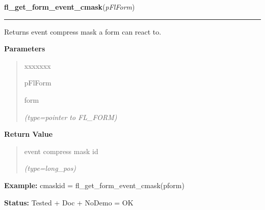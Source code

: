     \label{xformslib:flbasic:fl_get_form_event_cmask}

    \vspace{0.5ex}

\hspace{.8\funcindent}\begin{boxedminipage}{\funcwidth}

    \raggedright \textbf{fl\_get\_form\_event\_cmask}(\textit{pFlForm})

    \vspace{-1.5ex}

    \rule{\textwidth}{0.5\fboxrule}
\setlength{\parskip}{2ex}
    Returns event compress mask a form can react to.

\setlength{\parskip}{1ex}
      \textbf{Parameters}
      \vspace{-1ex}

      \begin{quote}
        \begin{Ventry}{xxxxxxx}

          \item[pFlForm]

          form

            {\it (type=pointer to FL\_FORM)}

        \end{Ventry}

      \end{quote}

      \textbf{Return Value}
    \vspace{-1ex}

      \begin{quote}
      event compress mask id

      {\it (type=long\_pos)}

      \end{quote}

\textbf{Example:} cmaskid = fl\_get\_form\_event\_cmask(pform)



\textbf{Status:} Tested + Doc + NoDemo = OK



    \end{boxedminipage}

    \label{xformslib:flbasic:fl_set_form_geometry}

